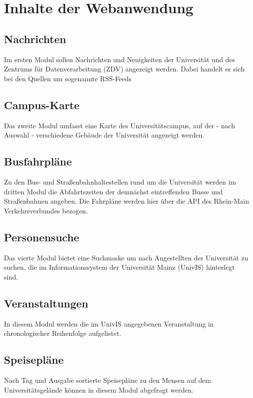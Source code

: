 %
\chapter{Inhalte der Webanwendung}
\label{sec:contents}

\cleanchapterquote{}{}{()}

\section{Nachrichten}
\label{sec:contents:news}
Im ersten Modul sollen Nachrichten und Neuigkeiten der Universität und des Zentrums für Datenverarbeitung (ZDV) angezeigt werden. Dabei handelt es sich bei den Quellen um sogenannte RSS-Feeds

\section{Campus-Karte}
\label{sec:contents:map}
Das zweite Modul umfasst eine Karte des Universitätscampus, auf der - nach Auswahl - verschiedene Gebäude der Universität angezeigt werden.

\section{Busfahrpläne}
\label{sec:contents:bus}
Zu den Bus- und Straßenbahnhaltestellen rund um die Universität werden im dritten Modul die Abfahrtszeiten der demnächst eintreffenden Busse und Straßenbahnen angeben.
Die Fahrpläne werden hier über die API des Rhein-Main Verkehrsverbundes bezogen.

\section{Personensuche}
\label{sec:contents:searchPerson}
Das vierte Modul bietet eine Suchmaske um nach Angestellten der Universität zu suchen, die im Informationssystem der Universität Mainz (UnivIS) hinterlegt sind.

\section{Veranstaltungen}
\label{sec:contents:events}
In diesem Modul werden die im UnivIS angegebenen Veranstaltung in chronologischer Reihenfolge aufgelistet.

\section{Speisepläne}
\label{sec:contents:canteens}
Nach Tag und Ausgabe sortierte Speisepläne zu den Mensen auf dem Universitätsgelände können in diesem Modul abgefragt werden.

